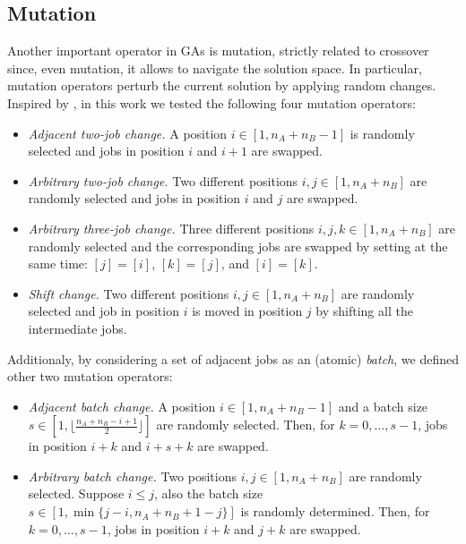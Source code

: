 \documentclass[opre,nonblindrev]{informs3} %
\begin{document}
\subsection{Mutation}
Another important operator in GAs is mutation, strictly related to crossover since, even mutation, it allows to navigate the solution space. In particular, mutation operators perturb the current solution by applying random changes.
Inspired by \cite{sched1}, in this work we tested the following four mutation operators:
\begin{itemize}
	\item \textit{Adjacent two-job change.} A position $i \in [1,n_A+n_B-1]$ is randomly selected and jobs in position $i$ and $i+1$ are swapped.
	\item \textit{Arbitrary two-job change.} Two different positions $i,j \in [1,n_A+n_B]$ are randomly selected and jobs in position $i$ and $j$ are swapped.
	\item \textit{Arbitrary three-job change.} Three different positions $i,j,k \in [1,n_A+n_B]$ are randomly selected and the corresponding jobs are swapped by setting at the same time: $[j] = [i]$, $[k] = [j]$, and $[i] = [k]$. 
	\item \textit{Shift change.} Two different positions $i,j \in [1,n_A+n_B]$ are randomly selected and job in position $i$ is moved in position $j$ by shifting all the intermediate jobs.
\end{itemize} 
Additionaly, by considering a set of adjacent jobs as an (atomic) \textit{batch}, we defined other two mutation operators:
\begin{itemize}
	\item \textit{Adjacent batch change.} A position $i \in [1,n_A+n_B-1]$ and a batch size $s \in [1,\lfloor{\frac{n_A+n_B-i+1}{2}}\rfloor]$ are randomly selected. Then, for $k=0,\ldots,s-1$, jobs in position $i+k$ and $i+s+k$ are swapped.
	\item \textit{Arbitrary batch change.} Two positions $i,j \in [1,n_A+n_B]$ are randomly selected. Suppose $i\le j$, also the batch size $s \in [1, \min\{j-i,n_A+n_B+1-j\}]$ is randomly determined. Then, for $k=0,\ldots,s-1$, jobs in position $i+k$ and $j+k$ are swapped. 
\end{itemize}
\end{document}
